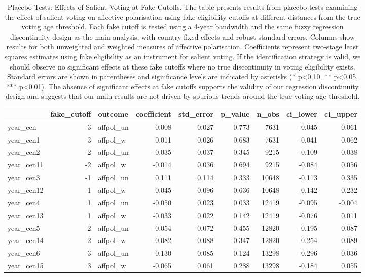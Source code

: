 \begin{table}
\centering
\begin{tabular}[t]{l|r|l|r|r|r|r|r|r}
\hline
  & fake\_cutoff & outcome & coefficient & std\_error & p\_value & n\_obs & ci\_lower & ci\_upper\\
\hline
year\_cen & -3 & affpol\_un & 0.008 & 0.027 & 0.773 & 7631 & -0.045 & 0.061\\
\hline
year\_cen1 & -3 & affpol\_w & 0.011 & 0.026 & 0.683 & 7631 & -0.041 & 0.062\\
\hline
year\_cen2 & -2 & affpol\_un & -0.035 & 0.037 & 0.345 & 9215 & -0.109 & 0.038\\
\hline
year\_cen11 & -2 & affpol\_w & -0.014 & 0.036 & 0.694 & 9215 & -0.084 & 0.056\\
\hline
year\_cen3 & -1 & affpol\_un & 0.111 & 0.114 & 0.333 & 10648 & -0.113 & 0.335\\
\hline
year\_cen12 & -1 & affpol\_w & 0.045 & 0.096 & 0.636 & 10648 & -0.142 & 0.232\\
\hline
year\_cen4 & 1 & affpol\_un & -0.050 & 0.023 & 0.033 & 12419 & -0.095 & -0.004\\
\hline
year\_cen13 & 1 & affpol\_w & -0.033 & 0.022 & 0.142 & 12419 & -0.076 & 0.011\\
\hline
year\_cen5 & 2 & affpol\_un & -0.054 & 0.072 & 0.455 & 12820 & -0.195 & 0.087\\
\hline
year\_cen14 & 2 & affpol\_w & -0.082 & 0.088 & 0.347 & 12820 & -0.254 & 0.089\\
\hline
year\_cen6 & 3 & affpol\_un & -0.130 & 0.085 & 0.124 & 13298 & -0.296 & 0.036\\
\hline
year\_cen15 & 3 & affpol\_w & -0.065 & 0.061 & 0.288 & 13298 & -0.184 & 0.055\\
\hline
\end{tabular}
\caption{Placebo Tests: Effects of Salient Voting at Fake Cutoffs. The table presents results from placebo tests examining the effect of salient voting on affective polarisation using fake eligibility cutoffs at different distances from the true voting age threshold. Each fake cutoff is tested using a 4-year bandwidth and the same fuzzy regression discontinuity design as the main analysis, with country fixed effects and robust standard errors. Columns show results for both unweighted and weighted measures of affective polarisation. Coefficients represent two-stage least squares estimates using fake eligibility as an instrument for salient voting. If the identification strategy is valid, we should observe no significant effects at these fake cutoffs where no true discontinuity in voting eligibility exists. Standard errors are shown in parentheses and significance levels are indicated by asterisks (* p<0.10, ** p<0.05, *** p<0.01). The absence of significant effects at fake cutoffs supports the validity of our regression discontinuity design and suggests that our main results are not driven by spurious trends around the true voting age threshold.}
\end{table}